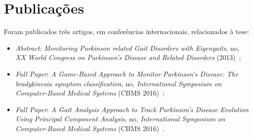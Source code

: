 \section{Publicações}\label{section:publicacoes}
Foram publicados três artigos, em conferências internacionais, relacionados à tese: 
  \begin{itemize}
   \item \textit{Abstract}: \textit{Monitoring Parkinson related Gait Disorders with Eigengaits}, no, \textit{XX World Congress on Parkinson's Disease and Related Disorders} (2013)~\cite{lmmeigengaits2013};
   \item \textit{Full Paper}: \textit{A Game-Based Approach to Monitor Parkinson’s Disease: The bradykinesia symptom classification}, no, \textit{International Symposium on Computer-Based Medical Systems} (CBMS 2016)~\cite{lmmcbmsgame2016};
   \item \textit{Full Paper}: \textit{A Gait Analysis Approach to Track Parkinson’s Disease Evolution Using Principal Component Analysis}, no, \textit{International Symposium on Computer-Based Medical Systems} (CBMS 2016)~\cite{lmmcbmsgait2016}.
  \end{itemize}




